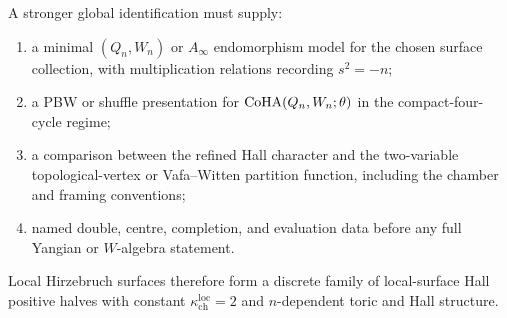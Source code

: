 A stronger global identification must supply:
\begin{enumerate}
 \item a minimal \((Q_n,W_n)\) or \(A_\infty\) endomorphism model for
 the chosen surface collection, with multiplication relations recording
 \(s^2=-n\);
 \item a PBW or shuffle presentation for \(\mathrm{CoHA}(Q_n,W_n;\theta)\) in
 the compact-four-cycle regime;
 \item a comparison between the refined Hall character and the
 two-variable topological-vertex or Vafa--Witten partition function,
 including the chamber and framing conventions;
 \item named double, centre, completion, and evaluation data before any
 full Yangian or \(W\)-algebra statement.
\end{enumerate}
Local Hirzebruch surfaces therefore form a discrete family of
local-surface Hall positive halves with constant
\(\kappa_{\mathrm{ch}}^{\mathrm{loc}}=2\) and \(n\)-dependent toric and
Hall structure.
